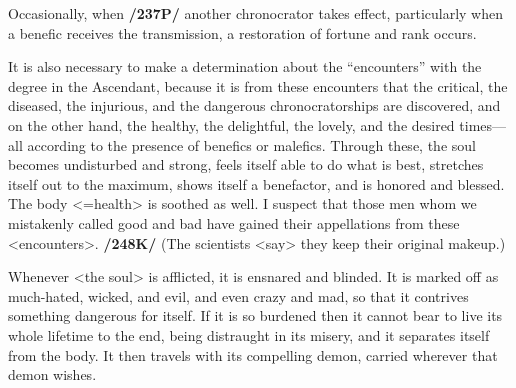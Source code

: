 Occasionally, when \textbf{/237P/} another chronocrator takes effect, particularly when a benefic receives the transmission, a restoration of fortune and rank occurs. 

It  is also necessary to make a determination about the “encounters” with the degree in the Ascendant, because it is from these encounters that the critical, the diseased, the injurious, and the dangerous chronocratorships are discovered, and on the other hand, the healthy, the delightful, the lovely, and the desired times—all according to the presence of benefics or malefics. Through these, the soul becomes undisturbed and strong, feels itself able to do what is best, stretches itself out to the maximum, shows itself a benefactor, and is honored and blessed. The body <=health> is soothed as well. I suspect that those men whom we mistakenly called good and bad have gained their appellations from these <encounters>. \textbf{/248K/} (The scientists <say> they keep their original makeup.) 

Whenever <the soul> is afflicted, it is ensnared and blinded. It is marked off as much-hated, wicked, and evil, and even crazy and mad, so that it contrives something dangerous for itself. If it is so burdened then it cannot bear to live its whole lifetime to the end, being distraught in its misery, and it separates itself from the body. It then travels with its compelling demon, carried wherever that demon wishes.
\newpage